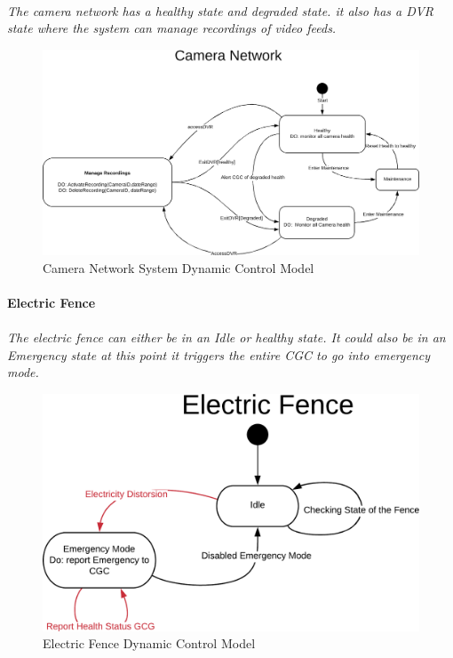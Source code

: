 \documentclass[12pt]{article}
\begin{document}
    \paragraph{}\textit{The camera network has a healthy state and degraded state. it also has a DVR state where the system can manage recordings of video feeds.}
    \begin{figure}[H]
         \centerline{\includegraphics[scale=0.80]{CameraNetwork.png}}
         \caption{Camera Network System Dynamic Control Model}
          \label{fig:cameranetwork}
    \end{figure}

    \paragraph{Electric Fence}
    \paragraph{}\textit{The electric fence can either be in an Idle or healthy state. It could also be in an Emergency state at this point it triggers the entire CGC to go into emergency mode.}
    \begin{figure}[H]
         \centerline{\includegraphics[scale=0.80]{ElectricFence.png}}
         \caption{Electric Fence Dynamic Control Model}
          \label{fig:electricfence}
    \end{figure}
\end{document}

